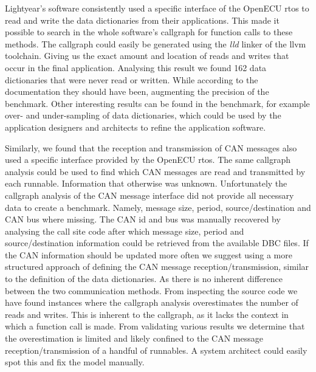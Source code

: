 Lightyear's software consistently used a specific interface of the OpenECU rtos to read and write the data dictionaries from their applications. This made it possible to search in the whole software's callgraph for function calls to these methods. The callgraph could easily be generated using the \textit{lld} linker of the llvm toolchain. Giving us the exact amount and location of reads and writes that occur in the final application. Analysing this result we found 162 data dictionaries that were never read or written. While according to the documentation they should have been, augmenting the precision of the benchmark. Other interesting results can be found in the benchmark, for example over- and under-sampling of data dictionaries, which could be used by the application designers and architects to refine the application software.

Similarly, we found that the reception and transmission of CAN messages also used a specific interface provided by the OpenECU rtos. The same callgraph analysis could be used to find which CAN messages are read and transmitted by each runnable. Information that otherwise was unknown. Unfortunately the callgraph analysis of the CAN message interface did not provide all necessary data to create a benchmark. Namely, message size, period, source/destination and CAN bus where missing. The CAN id and bus was manually recovered by analysing the call site code after which message size, period and source/destination information could be retrieved from the available DBC files. If the CAN information should be updated more often we suggest using a more structured approach of defining the CAN message reception/transmission, similar to the definition of the data dictionaries. As there is no inherent difference between the two communication methods. From inspecting the source code we have found instances where the callgraph analysis overestimates the number of reads and writes. This is inherent to the callgraph, as it lacks the context in which a function call is made. From validating various results we determine that the overestimation is limited and likely confined to the CAN message reception/transmission of a handful of runnables. A system architect could easily spot this and fix the model manually.

